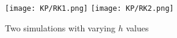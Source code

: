 \documentclass[11pt]{article}
\begin{document}
\begin{figure}[H]
  \centering
  \texttt{[image: KP/RK1.png]} \hfill
  \texttt{[image: KP/RK2.png]} 
  \caption{Two simulations with varying $h$ values}
  \label{fig:three-in-line}
\end{figure}





\end{document}
